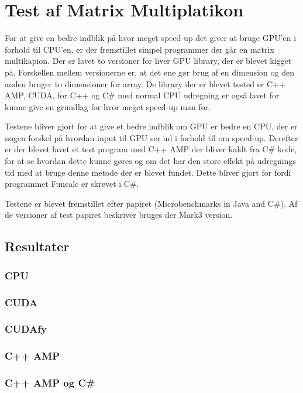 \section{Test af Matrix Multiplatikon}
For at give en bedre indblik på hvor meget speed-up det giver at bruge GPU'en i forhold til CPU'en, er der fremstillet simpel programmer der går en matrix multikapion. Der er lavet to versioner for hver GPU library, der er blevet kigget på. Forskellen mellem versionerne er, at det ene gør brug af en dimension og den anden bruger to dimensioner for array. De library der er blevet tested er C++ AMP, CUDA, for C++ og C\# med normal CPU udregning er også lavet for kunne give en grundlag for hvor meget speed-up man for.

Testene bliver gjort for at give et bedre indblik om GPU er bedre en CPU, der er nogen forskel på hvordan input til GPU ser ud i forhold til om speed-up. Derefter er der blevet lavet et test program med C++ AMP der bliver kaldt fra C\# kode, for at se hvordan dette kunne gøres og om det har den store effekt på udregnings tid med at bruge denne metode der er blevet fundet. Dette bliver gjort for fordi programmet Funcalc er skrevet i C\#.

Testene er blevet fremstillet efter papiret (Microbenchmarks in Java and C\#). Af de versioner af test papiret beskriver bruges der Mark3 version.


\subsection{Resultater}
\subsubsection{CPU}
\subsubsection{CUDA}
\subsubsection{CUDAfy}
\subsubsection{C++ AMP}
\subsubsection{C++ AMP og C\#}

